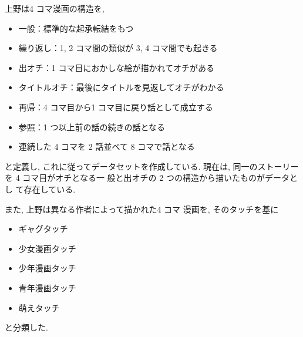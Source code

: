 上野は4 コマ漫画の構造を,

\begin{itemize}
  \item 一般：標準的な起承転結をもつ
  \item 繰り返し：1, 2 コマ間の類似が 3, 4 コマ間でも起きる
  \item 出オチ：1 コマ目におかしな絵が描かれてオチがある
  \item タイトルオチ：最後にタイトルを見返してオチがわかる
  \item 再帰：4 コマ目から1 コマ目に戻り話として成立する
  \item 参照：1 つ以上前の話の続きの話となる
  \item 連続した 4 コマを 2 話並べて 8 コマで話となる
\end{itemize}

と定義し, これに従ってデータセットを作成している.
現在は, 同一のストーリーを 4 コマ目がオチとなる一
般と出オチの 2 つの構造から描いたものがデータとし
て存在している.

また, 上野は異なる作者によって描かれた4 コマ
漫画を, そのタッチを基に

\begin{itemize}
  \item ギャグタッチ
  \item 少女漫画タッチ
  \item 少年漫画タッチ
  \item 青年漫画タッチ
  \item 萌えタッチ
\end{itemize}

と分類した.

